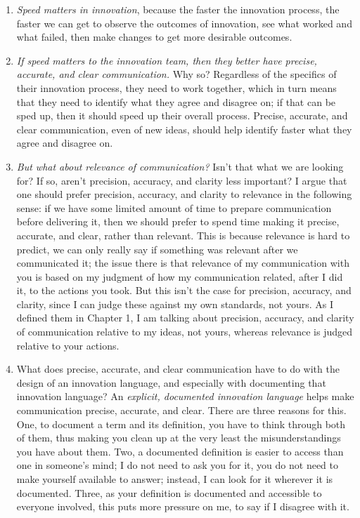 \begin{enumerate}
	\item{\textit{Speed matters in innovation}, because the faster the innovation process, the faster we can get to observe the outcomes of innovation, see what worked and what failed, then make changes to get more desirable outcomes.}
	\item{\textit{If speed matters to the innovation team, then they better have precise, accurate, and clear communication.} Why so? Regardless of the specifics of their innovation process, they need to work together, which in turn means that they need to identify what they agree and disagree on; if that can be sped up, then it should speed up their overall process. Precise, accurate, and clear communication, even of new ideas, should help identify faster what they agree and disagree on.}
	\item{\textit{But what about relevance of communication?} Isn't that what we are looking for? If so, aren't precision, accuracy, and clarity less important? I argue that one should prefer precision, accuracy, and clarity to relevance in the following sense: if we have some limited amount of time to prepare communication before delivering it, then we should prefer to spend time making it precise, accurate, and clear, rather than relevant. This is because relevance is hard to predict, we can only really say if something was relevant after we communicated it; the issue there is that relevance of my communication with you is based on my judgment of how my communication related, after I did it, to the actions you took. But this isn't the case for precision, accuracy, and clarity, since I can judge these against my own standards, not yours. As I defined them in Chapter 1, I am talking about precision, accuracy, and clarity of communication relative to my ideas, not yours, whereas relevance is judged relative to your actions.}
	\item{What does precise, accurate, and clear communication have to do with the design of an innovation language, and especially with documenting that innovation language? An \textit{explicit, documented innovation language} helps make communication precise, accurate, and clear. There are three reasons for this. One, to document a term and its definition, you have to think through both of them, thus making you clean up at the very least the misunderstandings you have about them. Two, a documented definition is easier to access than one in someone's mind; I do not need to ask you for it, you do not need to make yourself available to answer; instead, I can look for it wherever it is documented. Three, as your definition is documented and accessible to everyone involved, this puts more pressure on me, to say if I disagree with it.}

\end{enumerate}
